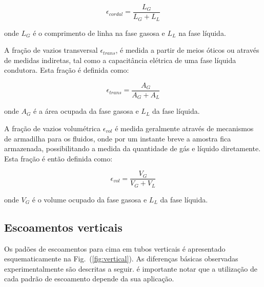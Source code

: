 \begin{equation}
	\epsilon_{cordal} = \frac{L_G}{L_G+L_L}
\end{equation}

\noindent onde $L_G$ é o comprimento de linha na fase gasosa e $L_L$ na
fase líquida.

A fração de vazios transversal $\epsilon_{trans}$, é medida a partir de
meios óticos ou através de medidas indiretas, tal como a capacitância
elétrica de uma fase líquida condutora. Esta fração é definida como:

\begin{equation}
	\epsilon_{trans} = \frac{A_G}{A_G+A_L}
\end{equation}

\noindent onde $A_G$ é a área ocupada da fase gasosa e $L_L$
da fase líquida.

A fração de vazios volumétrica $\epsilon_{vol}$ é medida geralmente
através de mecanismos de armadilha para os fluidos, onde por um instante
breve a amostra fica armazenada, possibilitando a medida da quantidade
de gás e líquido diretamente. Esta fração é então definida como:

\begin{equation}
	\epsilon_{vol} = \frac{V_G}{V_G+V_L}
\end{equation}

\noindent onde $V_G$ é o volume ocupado da fase gasosa e $L_L$ da fase
líquida.

\subsection{Escoamentos verticais}

Os padões de escoamentos para cima em tubos verticais é apresentado
esquematicamente na Fig.~(\ref{fig:vertical}). As diferenças básicas
observadas experimentalmente são descritas a seguir. é importante notar
que a utilização de cada padrão de escoamento depende da sua aplicação. 

